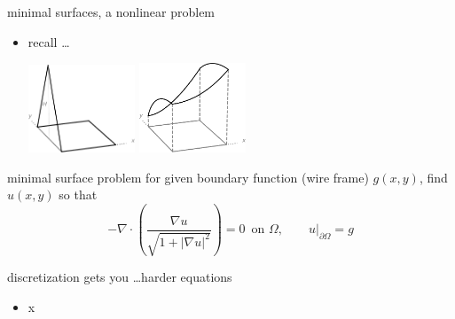 \documentclass[10pt,
               svgnames,
               hyperref={colorlinks,citecolor=DeepPink4,linkcolor=FireBrick,urlcolor=Maroon},
               usepdftitle=false]{beamer}
\newcommand{\grad}{\nabla}
\newcommand{\Div}{\nabla \cdot}
\begin{document}
\begin{frame}{minimal surfaces, a nonlinear problem}
\begin{itemize}
\item recall \dots

\vspace{-10mm}
\hfill \includegraphics[width=0.25\textwidth]{images/tent.png} \includegraphics[width=0.25\textwidth]{images/catenary.png}
\end{itemize}

\bigskip
\begin{block}{minimal surface problem} for given boundary function (wire frame) $g(x,y)$, find $u(x,y)$ so that
    $$-\Div \left(\frac{\grad u}{\sqrt{1 + |\grad u|^2}}\right) = 0 \, \text{ on } \Omega, \qquad u\big|_{\partial \Omega} = g$$
\end{block}
\end{frame}


\begin{frame}{discretization gets you \dots harder equations}
\begin{itemize}
\item x
\end{itemize}
\end{frame}
\end{document}
